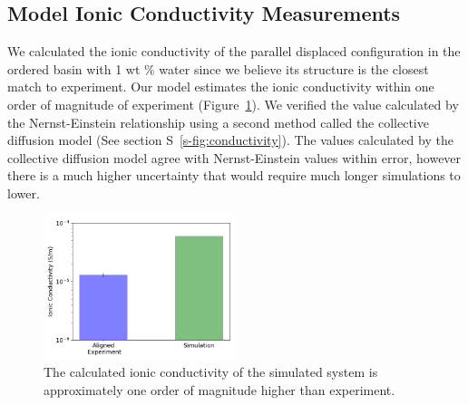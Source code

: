 \documentclass[journal=jpcbfk,manusciprt=article]{achemso}
\begin{document}
  \subsection{Model Ionic Conductivity Measurements}
 

  
  
  
  We calculated the ionic conductivity of the parallel displaced configuration in
  the ordered basin with 1 wt \% water since we believe its structure is the 
  closest match to experiment. Our model estimates the ionic conductivity within
  one order of magnitude of experiment (Figure~\ref{fig:ionic_conductivity}). We
  verified the value calculated by the Nernst-Einstein relationship using a 
  second method called the collective diffusion model\cite{liu_collective_2013} 
  (See section S~\ref{s-fig:conductivity}). The values calculated by the 
  collective diffusion model agree with Nernst-Einstein  values within error, 
  however there is a much higher uncertainty that would require much longer 
  simulations to lower.
  

  \begin{figure}
  \centering
  \includegraphics[width=0.5\textwidth]{IC_nernst.png}
  \caption{The calculated ionic conductivity of the simulated system is approximately
  one order of magnitude higher than experiment.}\label{fig:ionic_conductivity}
  \end{figure}
\end{document}
